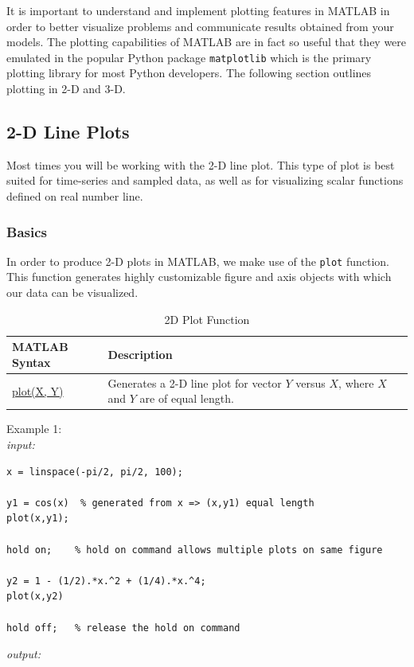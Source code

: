 \documentclass[../MATLAB_Primer.tex]{subfiles}
\begin{document}
It is important to understand and implement plotting features in MATLAB in order to better visualize problems and communicate results obtained from your models.  The plotting capabilities of MATLAB are in fact so useful that they were emulated in the popular Python package \texttt{matplotlib} which is the primary plotting library for most Python developers. The following section outlines plotting in 2-D and 3-D. 

\subsection{2-D Line Plots}
Most times you will be working with the 2-D line plot.  This type of plot is best suited for time-series and sampled data, as well as for visualizing scalar functions defined on real number line.  

\subsubsection{Basics}
In order to produce 2-D plots in MATLAB, we make use of the \texttt{plot} function.  This function generates highly customizable figure and axis objects with which our data can be visualized.

\begin{table}[H]
\caption{2D Plot Function}
    \begin{center}
        \begin{tabular}{| C{3cm} | m{12cm}|}
            \hline
            \textbf{MATLAB Syntax} & \textbf{Description}\\
            
            \hline
            \href{https://www.mathworks.com/help/matlab/ref/plot.html}{\color{blue}plot(X, Y)} & Generates a 2-D line plot for vector $Y$ versus $X$, where $X$ and $Y$ are of equal length.  \\
            \hline
        \end{tabular}
        \label{tab:2D_plotting}
    \end{center}
\end{table}

Example 1:\\

\textit{input:}
\begin{lstlisting}
x = linspace(-pi/2, pi/2, 100);

y1 = cos(x)  % generated from x => (x,y1) equal length
plot(x,y1);

hold on;    % hold on command allows multiple plots on same figure

y2 = 1 - (1/2).*x.^2 + (1/4).*x.^4;
plot(x,y2)

hold off;   % release the hold on command

\end{lstlisting}
\textit{output:}
\end{document}

